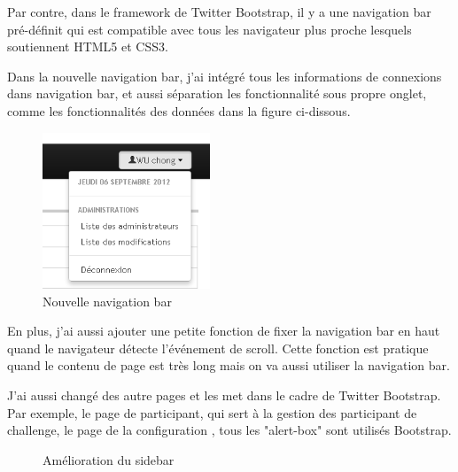 Par contre, dans le framework de Twitter Bootstrap, il y a une navigation bar pré-définit qui est compatible avec tous les navigateur plus proche lesquels soutiennent HTML5 et CSS3.

Dans la nouvelle navigation bar, j'ai intégré tous les informations de connexions dans navigation bar, et aussi séparation les fonctionnalité sous propre onglet, comme les fonctionnalités des données dans la figure ci-dissous. 

 \begin{figure}[hbtp]
\centering
\includegraphics[width=5cm]{body/images/info-connexion.png}
\caption{Nouvelle navigation bar}
\end{figure}

En plus, j'ai aussi ajouter une petite fonction de fixer la navigation bar en haut quand le navigateur détecte l'événement de scroll. Cette fonction est pratique quand le contenu de page est très long mais on va aussi utiliser la navigation bar.

J'ai aussi changé des autre pages et les met dans le cadre de Twitter Bootstrap. Par exemple, le page de participant, qui sert à la gestion des participant de challenge, le page de la configuration , tous les "alert-box" sont utilisés Bootstrap.
\begin{figure}
  \centering
  \caption{Amélioration du sidebar}
\end{figure}



